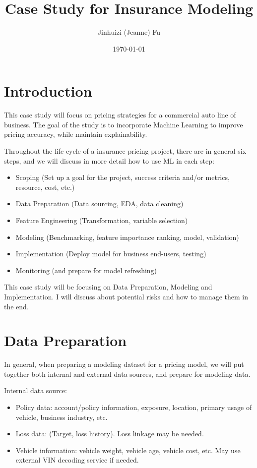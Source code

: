 \documentclass{article}
\title{Case Study for Insurance Modeling}
\author{Jinhuizi (Jeanne) Fu}
\date{\today}
\begin{document}
\maketitle

\section{Introduction}
This case study will focus on pricing strategies for a commercial auto line of business. The goal of the study is to incorporate Machine Learning to improve pricing accuracy, while maintain explainability.

Throughout the life cycle of a insurance pricing project, there are in general six steps, and we will discuss in more detail how to use ML in each step:

\begin{itemize}
    \item Scoping (Set up a goal for the project, success criteria and/or metrics, resource, cost, etc.)
    \item Data Preparation (Data sourcing, EDA, data cleaning)
    \item Feature Engineering (Transformation, variable selection)
    \item Modeling (Benchmarking, feature importance ranking, model, validation)
    \item Implementation (Deploy model for business end-users, testing)
    \item Monitoring (and prepare for model refreshing)
\end{itemize}

This case study will be focusing on Data Preparation, Modeling and Implementation. I will discuss about potential risks and how to manage them in the end.

\section{Data Preparation}
In general, when preparing a modeling dataset for a pricing model, we will put together both internal and external data sources, and prepare for modeling data.

Internal data source:
\begin{itemize}
    \item Policy data: account/policy information, exposure, location, primary usage of vehicle, business industry, etc.
    \item Loss data: (Target, loss history). Loss linkage may be needed. 
    \item Vehicle information: vehicle weight, vehicle age, vehicle cost, etc. May use external VIN decoding service if needed.
\end{itemize}
\end{document}
